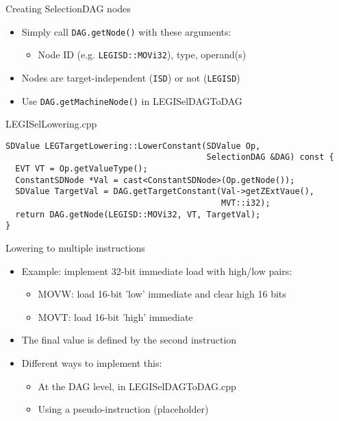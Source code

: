 \begin{frame}[fragile]{Creating SelectionDAG nodes}

\begin{itemize}
    \item Simply call \texttt{DAG.getNode()} with these arguments:
    \begin{itemize}
        \item Node ID (e.g. \texttt{LEGISD::MOVi32}), type, operand(s)
    \end{itemize}
    \item Nodes are target-independent (\texttt{ISD}) or not (\texttt{LEGISD})
    \item Use \texttt{DAG.getMachineNode()} in LEGISelDAGToDAG
\end{itemize}

\begin{block}{LEGISelLowering.cpp}
\begin{lstlisting}
SDValue LEGTargetLowering::LowerConstant(SDValue Op,
                                         SelectionDAG &DAG) const {
  EVT VT = Op.getValueType();
  ConstantSDNode *Val = cast<ConstantSDNode>(Op.getNode());
  SDValue TargetVal = DAG.getTargetConstant(Val->getZExtVaue(),
                                            MVT::i32);
  return DAG.getNode(LEGISD::MOVi32, VT, TargetVal);
}
\end{lstlisting}
\end{block}

\end{frame}


\begin{frame}{Lowering to multiple instructions}

\begin{itemize}
    \item Example: implement 32-bit immediate load with high/low pairs:
    \begin{itemize}
        \item MOVW: load 16-bit 'low' immediate and clear high 16 bits
        \item MOVT: load 16-bit 'high' immediate
    \end{itemize}
    \item The final value is defined by the second instruction
    \item Different ways to implement this:
    \begin{itemize}
        \item At the DAG level, in LEGISelDAGToDAG.cpp
        \item Using a pseudo-instruction (placeholder)
    \end{itemize}
\end{itemize}

\end{frame}


